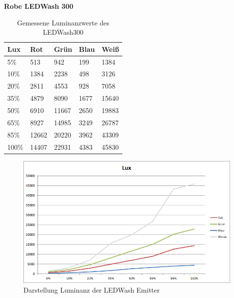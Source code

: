 \documentclass[11pt]{scrartcl}
\begin{document}
\textbf{Robe LEDWash 300}
\begin{table}[H]
    \begin{tabularx}{\textwidth}{|X|X|X|X|X|}
        \hline
        Lux   & Rot   & Grün  & Blau & Weiß \\\hline
        5\%   & 513   & 942   & 199  & 1384 \\\hline
        10\%  & 1384  & 2238  & 498  & 3126 \\\hline
        20\%  & 2811  & 4553  & 928  & 7058 \\\hline
        35\%  & 4879  & 8090  & 1677 & 15640\\\hline
        50\%  & 6910  & 11667 & 2650 & 19883\\\hline
        65\%  & 8927  & 14985 & 3249 & 26787\\\hline
        85\%  & 12662 & 20220 & 3962 & 43309\\\hline
        100\% & 14407 & 22931 & 4383 & 45830\\\hline
    \end{tabularx}
    \caption{Gemessene Luminanzwerte des LEDWash300} \label{table:luxLedWash}
\end{table}
\noindent
\begin{figure}[H]
    \begin{center}
        \includegraphics[width=\textwidth]{images/charts/led_wash_300.png}
    \end{center}
    \caption{Darstellung Luminanz der LEDWash Emitter} \label{fig:luxLedWash}
\end{figure}
\end{document}
